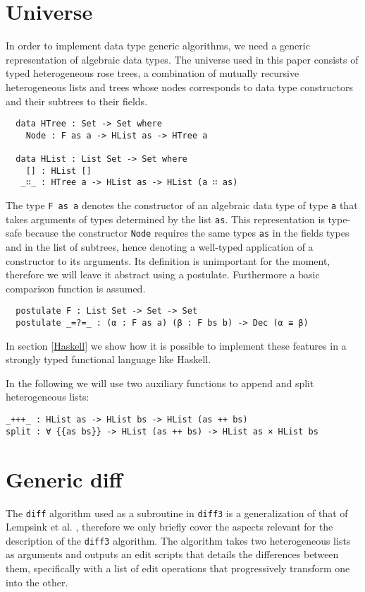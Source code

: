 \documentclass[preprint]{sigplanconf}
\begin{document}
\section{Universe}
In order to implement data type generic algorithms, we need a generic representation of algebraic data types.
The universe used in this paper consists of typed heterogeneous rose trees,
a combination of mutually recursive heterogeneous lists and trees
whose nodes corresponds to data type constructors and their subtrees
to their fields.
\begin{verbatim}
  data HTree : Set -> Set where
    Node : F as a -> HList as -> HTree a

  data HList : List Set -> Set where
    [] : HList []
   _∷_ : HTree a -> HList as -> HList (a ∷ as)
\end{verbatim}
	The type \texttt{F as a} denotes the constructor of an algebraic data
	type of type \texttt{a} that takes arguments of types determined by the list 
	\texttt{as}. This representation is type-safe because the constructor
	\texttt{Node} requires the same types \texttt{as} in the fields types and in 
	the list of subtrees, hence denoting a 	well-typed application of a 
	constructor to its arguments.
	Its definition is unimportant for the moment, therefore we will leave it
	abstract using a postulate. Furthermore a basic comparison
	function is assumed.
\begin{verbatim}
  postulate F : List Set -> Set -> Set 
  postulate _=?=_ : (α : F as a) (β : F bs b) -> Dec (α ≡ β)
\end{verbatim}	
	In section \ref{Haskell} we show how it is possible to implement these 
	features in a strongly typed functional language like Haskell.
	
	In the following we will use two auxiliary functions to append and split 
	heterogeneous lists:
\begin{verbatim}
_+++_ : HList as -> HList bs -> HList (as ++ bs)
split : ∀ {{as bs}} -> HList (as ++ bs) -> HList as × HList bs
\end{verbatim}
	
\section{Generic diff}
	The \texttt{diff} algorithm used as a subroutine in \texttt{diff3} is a
	generalization of that of Lempsink et al. \cite{Lemp09}, therefore
	we only briefly cover the aspects relevant for the description of
	the \texttt{diff3} algorithm.
	The algorithm takes two heterogeneous lists as arguments and
	outputs an edit scripts that details the differences between them,
	specifically with a list of edit operations that progressively 	
	transform one into the other.
\end{document}
